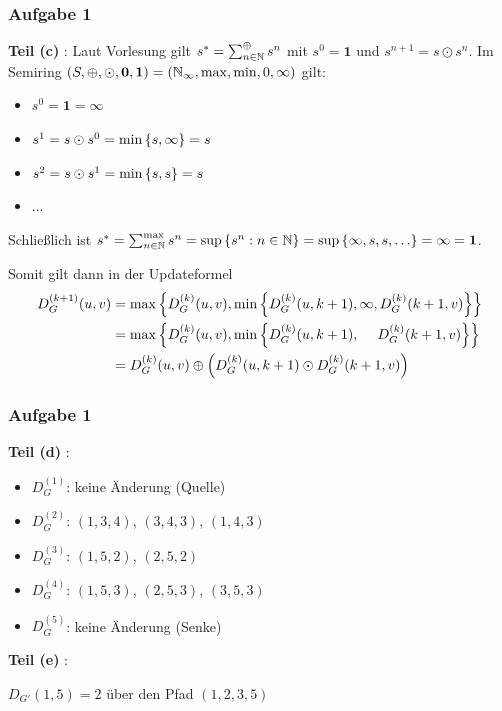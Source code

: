 \documentclass{beamer}
\begin{document}
\begin{frame} \frametitle{Aufgabe 1}
	\textbf{Teil (c)} :
	\small
	Laut Vorlesung gilt $s^\ast = \sum_{n \in \mathbb{N}}^{\oplus} s^n$ mit $s^0 = \mathbf{1}$ und $s^{n+1} = s \odot s^n$. Im Semiring $(S, \oplus, \odot, \mathbf{0}, \mathbf{1}) = (\mathbb{N}_\infty, \max, \min, 0, \infty)$ gilt:
	\begin{itemize}
		\item $s^0 = \mathbf{1} = \infty$
		\item $s^1 = s \odot s^0 = \min \left\{ s, \infty \right\} = s$
		\item $s^2 = s \odot s^1 = \min \left\{ s, s \right\} = s$
		\item ...
	\end{itemize}
	Schließlich ist $s^\ast = \sum_{n \in \N}^{\max} s^n = \sup \menge{s^n : n \in \N} = \sup \menge{\infty , s, s, \dots} = \infty = \mathbf{1}$.
	
	Somit gilt dann in der Updateformel 
	\begin{equation*}
	\begin{aligned}
		D_G^{(k+1)}(u,v) &= \max \left\{ D_G^{(k)}(u,v) , \min\left\{ D_G^{(k)}(u,k+1) , \infty, D_G^{(k)}(k+1,v) \right\} \right\} \\
		&=	\max \left\{ D_G^{(k)}(u,v) , \min\left\{ D_G^{(k)}(u,k+1), \phantom{ \infty, } D_G^{(k)}(k+1,v) \right\} \right\} \\
		&= 	D_G^{(k)}(u,v) \oplus \left( D_G^{(k)}(u,k+1) \odot D_G^{(k)}(k+1,v) \right)
	\end{aligned}
	\end{equation*}
\end{frame}

\begin{frame} \frametitle{Aufgabe 1}
	\textbf{Teil (d)} :
	\begin{itemize}
		\item $D_G^{(1)}$: \hspace{.5em} keine Änderung (Quelle)
		\item $D_G^{(2)}$: \hspace{.5em} $(1,3,4)$, $(3,4,3)$, $(1,4,3)$
		\item $D_G^{(3)}$: \hspace{.5em} $(1,5,2)$, $(2,5,2)$
		\item $D_G^{(4)}$: \hspace{.5em} $(1,5,3)$, $(2,5,3)$, $(3,5,3)$
		\item $D_G^{(5)}$: \hspace{.5em} keine Änderung (Senke)
	\end{itemize}
	
	\pause
	
	\textbf{Teil (e)} :
	
	$D_{G'}(1,5) = 2$ über den Pfad $(1,2,3,5)$
\end{frame}
\end{document}
